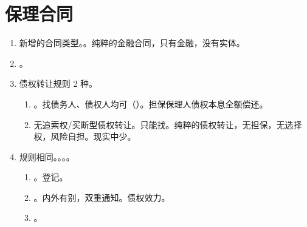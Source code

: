 \section{保理合同}
\begin{enumerate}
  \item 新增的合同类型。。纯粹的金融合同，只有金融，没有实体。
  \item {}。
  \item 债权转让规则 2 种。
        \begin{enumerate}
          \item {}。找债务人、债权人均可（）。担保保理人债权本息全额偿还。
          \item 无追索权/买断型债权转让。只能找。纯粹的债权转让，无担保，无选择权，风险自担。现实中少。
        \end{enumerate}
  \item 规则相同。。。。
        \begin{enumerate}
          \item {}。登记。
          \item {}。内外有别，双重通知。债权效力。
          \item {}。
        \end{enumerate}
\end{enumerate}
